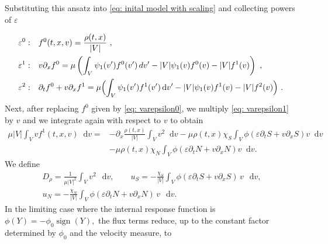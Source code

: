 \documentclass[11pt,twoside]{article}
\numberwithin{equation}{section}
\DeclareMathOperator{\sign}{sign}
\newcommand*\diff{\mathop{}\!\mathrm{d}}
\theoremstyle{plain}
\theoremstyle{nonumberplain}
\begin{document}
Substituting this ansatz into \eqref{eq: inital model with scaling} and collecting powers of $\varepsilon$

\begin{align}
    \varepsilon^0: & \quad f^0(t,{x},{v})=\frac{\rho(t,{x})}{|V|}\ ,\label{eq: varepsilon0}\\
    \varepsilon^1: & \quad 
    v \partial_x f^0
=
\mu \left(
\int_V \psi_1(v') f^0(v')\,dv'
- |V| \psi_1(v) f^0(v)
- |V| f^1(v)
\right)\ ,\label{eq: varepsilon1}\\
    \varepsilon^2: & \quad \partial_tf^0+{v}\partial_x f^1 =\mu\Bigl(\int_V\psi_1(v')f^1(v')\diff v'-|V|\psi_1(v)f^1(v)-|V|f^2(v)\Bigr) \ \label{eq: varepsilon2}.\
\end{align}
Next, after replacing $f^0$ given by  \eqref{eq: varepsilon0}, we multiply \eqref{eq: varepsilon1} by ${v}$ and we integrate again with respect to ${v}$ to obtain
\begin{align}
    \mu|V|\int_V vf^1(t,x,v) \diff v=&-\partial_x\frac{\rho(t,x)}{|V|}\int_V v^2\diff v-\mu\rho(t,x)\chi_S\int_V\phi(\varepsilon\partial_tS+v\partial_xS)v\diff v\nonumber\\ &-\mu\rho(t,x)\chi_N\int_V\phi(\varepsilon\partial_tN+v\partial_xN)v\diff v.\label{eq: mean direction}
\end{align}
We define
\begin{equation}
\label{eq: moment}
\begin{gathered}
D_\rho
=
\frac{1}{\mu |V|^2}\int_V v^2\,\diff v,
\qquad
u_S
=
-\frac{\chi_S}{|V|}
\int_V \phi(\varepsilon\partial_t S+v\partial_x S)\,v\,\diff v,
\\[4pt]
u_N
=
-\frac{\chi_N}{|V|}
\int_V \phi(\varepsilon\partial_t N+v\partial_x N)\,v\,\diff v .
\end{gathered}
\end{equation}
In the limiting case where the internal response function is $\phi(Y)=-\phi_0\sign(Y),$
the flux terms reduce, up to the constant factor determined by
$\phi_0$ and the velocity measure, to \cite{calvez2019chemotactic}
\end{document}

